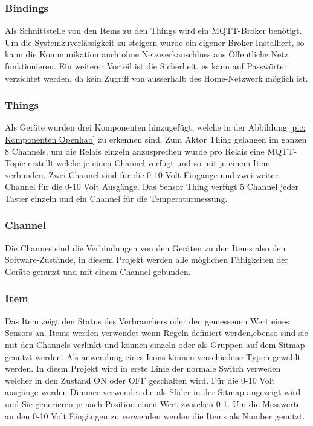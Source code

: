 \subsubsection{Bindings}
Als Schnittstelle von den Items zu den Things wird ein MQTT-Broker benötigt. Um die Systemzuverlässigkeit zu steigern wurde ein eigener Broker Installiert, so kann die Kommunikation auch ohne Netzwerkanschluss ans Öffentliche Netz funktionieren. Ein weiterer Vorteil ist die Sicherheit, es kann auf Passwörter verzichtet werden, da kein Zugriff von ausserhalb des Home-Netzwerk möglich ist.

\subsubsection{Things}
 Als Geräte wurden drei Komponenten hinzugefügt, welche in der Abbildung \ref{pic: Komponenten Openhab} zu erkennen sind. Zum Aktor Thing gelangen im ganzen 8 Channels, um die Relais einzeln anzusprechen wurde pro Relais eine MQTT-Topic erstellt welche je einen Channel verfügt und so mit je einem Item verbunden. Zwei Channel sind für die 0-10 Volt Eingänge und zwei weiter Channel für die 0-10 Volt Ausgänge. Das Sensor Thing verfügt 5 Channel jeder Taster einzeln und ein Channel für die Temperaturmessung.

\subsubsection{Channel}
Die Channes sind die Verbindungen von den Geräten zu den Items also den Software-Zustände, in diesem Projekt werden alle möglichen Fähigkeiten der Geräte genutzt und mit einem Channel gebunden.

\subsubsection{Item}
Das Item zeigt den Status des Verbrauchers oder den gemessenen Wert eines Sensors an. Items werden verwendet wenn Regeln definiert werden,ebenso sind sie mit den Channels verlinkt und können einzeln oder als Gruppen auf dem Sitmap genutzt werden. Als anwendung eines Icons können verschiedene Typen gewählt werden. In diesm Projekt wird in erste Linie der normale Switch verweden welcher in den Zustand ON oder OFF geschalten wird. Für die 0-10 Volt ausgänge werden Dimmer verwendet die als Slider in der Sitmap angezeigt wird und Sie generieren je nach Position einen Wert zwischen 0-1. Um die Messwerte an den 0-10 Volt Eingängen zu verwenden werden die Items als Number genutzt.

